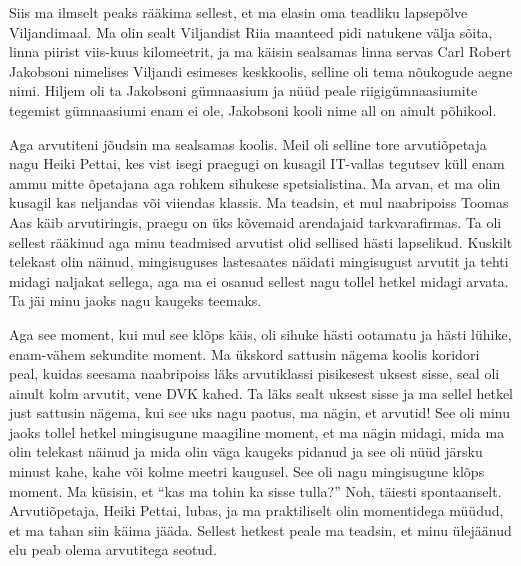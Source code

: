 

Siis ma ilmselt peaks rääkima sellest, et ma  elasin oma teadliku lapsepõlve Viljandimaal. Ma olin sealt Viljandist Riia maanteed pidi natukene välja sõita,  linna piirist viis-kuus kilomeetrit, ja ma käisin sealsamas linna servas Carl Robert Jakobsoni nimelises Viljandi esimeses keskkoolis, selline oli tema nõukogude aegne nimi. Hiljem oli ta Jakobsoni gümnaasium ja nüüd peale riigigümnaasiumite tegemist gümnaasiumi enam ei ole, Jakobsoni kooli nime all on ainult põhikool. 

Aga arvutiteni jõudsin ma sealsamas koolis. Meil oli selline tore arvutiõpetaja nagu Heiki Pettai, kes vist isegi praegugi on kusagil IT-vallas tegutsev küll enam ammu mitte õpetajana aga rohkem sihukese spetsialistina. Ma arvan, et ma olin kusagil kas neljandas või viiendas klassis. Ma teadsin, et mul naabripoiss Toomas Aas käib  arvutiringis, praegu on üks kõvemaid arendajaid tarkvarafirmas. Ta oli sellest rääkinud aga minu teadmised arvutist olid sellised hästi  lapselikud. Kuskilt telekast olin näinud, mingisuguses lastesaates näidati mingisugust arvutit ja tehti midagi naljakat sellega, aga ma ei osanud sellest nagu tollel hetkel midagi arvata. Ta jäi minu jaoks nagu kaugeks teemaks. 

Aga see moment, kui mul see klõps käis, oli sihuke hästi ootamatu ja hästi lühike, enam-vähem sekundite moment. Ma ükskord sattusin nägema koolis koridori peal, kuidas seesama naabripoiss läks  arvutiklassi  pisikesest uksest sisse, seal oli ainult kolm arvutit, vene DVK kahed. Ta läks sealt uksest sisse ja ma sellel hetkel just sattusin nägema, kui see uks nagu paotus, ma nägin, et arvutid! See oli minu jaoks tollel hetkel mingisugune maagiline moment, et ma nägin midagi, mida ma olin telekast näinud ja mida olin väga kaugeks pidanud ja see oli nüüd järsku minust kahe, kahe või kolme meetri kaugusel. See oli nagu mingisugune klõps moment. Ma küsisin, et \enquote{kas ma tohin ka sisse tulla?} Noh, täiesti spontaanselt. Arvutiõpetaja, Heiki Pettai,  lubas, ja ma praktiliselt olin momentidega müüdud, et ma tahan siin käima jääda. Sellest hetkest peale ma teadsin, et minu ülejäänud elu peab olema arvutitega seotud. 


